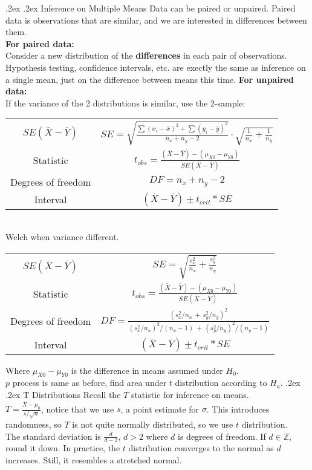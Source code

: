 \documentclass[10pt,landscape]{article}
\makeatletter
\renewcommand{\subsection}{\@startsection{subsection}{2}{0mm}%
                                {.2ex}%
                                {.2ex}%
                                {\normalfont\normalsize\bfseries}}
\makeatother
\begin{document}
\begin{multicols}{3}
\subsection{Inference on Multiple Means}
Data can be paired or unpaired. 
Paired data is observations that are similar, and we are interested in differences between them. \\
\textbf{For paired data:} \\
Consider a new distribution of the \textbf{differences} in each pair of observations. \\
Hypothesis testing, confidence intervals, etc. are exectly the same as inference on a single mean, just on the difference between means this time.
\textbf{For unpaired data:} \\ 
If the variance of the 2 distributions is similar, use the 2-sample:
\begin{tabular}{@{}c@{}|@{}c@{}}
        \hline
$SE(\bar{X}-\bar{Y})$ & $SE=\sqrt{\frac{\sum(x_i-\bar{x})^2+\sum(y_i-\bar{y})^2}{n_x+n_y-2}}\cdot\sqrt{\frac1{n_x}+\frac1{n_y}}$   \\
Statistic & $t_{obs}=\frac{(\bar{X}-\bar{Y})-(\mu_{X0}-\mu_{Y0})}{SE(\bar{X}-\bar{Y})}$  \\
Degrees of freedom & $\textstyle DF=n_x+n_y-2$   \\
Interval & $(\bar{X}-\bar{Y})\pm t_{crit}*SE$   \\
\end{tabular} \\
Welch when variance different. \\
\begin{tabular}{@{}c@{}|@{}c@{}}
        \hline
$SE(\bar{X}-\bar{Y})$ & $SE=\sqrt{\frac{s_x^2}{n_x}+\frac{s_y^2}{n_y}}$  \\
Statistic & $t_{obs}=\frac{(\bar{X}-\bar{Y})-(\mu_{X0}-\mu_{Y0})}{SE(\bar{X}-\bar{Y})}$  \\
Degrees of freedom & $DF=\frac{(s_x^2/n_x\,+\,s_y^2/n_y)^2}{(s_x^2/n_x)^2/(n_x-1)\,+\,(s_y^2/n_y)^2/(n_y-1)}$  \\
Interval & $(\bar{X}-\bar{Y})\pm t_{crit}*SE$  \\
\end{tabular}
Where $\mu_{X0} - \mu_{Y0}$ is the difference in means assumed under $H_0$. \\
$p$ process is same as before, find area under $t$ distribution according to $H_a$.
\subsection{T Distributions}
Recall the $T$ statistic for inference on means. \\
$T = \frac{\bar{X} - \mu_0}{s / \sqrt{n}}$, notice that we use $s$, a point estimate for $\sigma$.
This introduces randomness, so $T$ is not quite normally distributed, so we use $t$ distribution. \\
The standard deviation is $\frac{d}{d-2}$, $d > 2$ where $d$ is degrees of freedom. If $d \in \mathbb{Z}$, round it down. 
In practice, the $t$ distribution converges to the normal as $d$ increases. Still, it resembles a stretched normal. 


\end{multicols}
\end{document}
